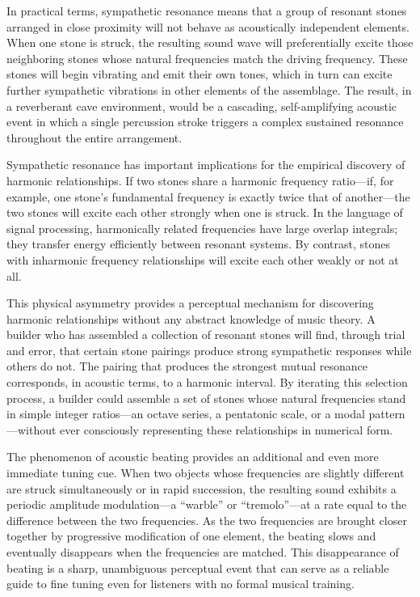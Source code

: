 \documentclass[12pt]{article}
\begin{document}
In practical terms, sympathetic resonance means that a group of resonant stones arranged in close proximity will not behave as acoustically independent elements. When one stone is struck, the resulting sound wave will preferentially excite those neighboring stones whose natural frequencies match the driving frequency. These stones will begin vibrating and emit their own tones, which in turn can excite further sympathetic vibrations in other elements of the assemblage. The result, in a reverberant cave environment, would be a cascading, self-amplifying acoustic event in which a single percussion stroke triggers a complex sustained resonance throughout the entire arrangement.

Sympathetic resonance has important implications for the empirical discovery of harmonic relationships. If two stones share a harmonic frequency ratio—if, for example, one stone's fundamental frequency is exactly twice that of another—the two stones will excite each other strongly when one is struck. In the language of signal processing, harmonically related frequencies have large overlap integrals; they transfer energy efficiently between resonant systems. By contrast, stones with inharmonic frequency relationships will excite each other weakly or not at all.

This physical asymmetry provides a perceptual mechanism for discovering harmonic relationships without any abstract knowledge of music theory. A builder who has assembled a collection of resonant stones will find, through trial and error, that certain stone pairings produce strong sympathetic responses while others do not. The pairing that produces the strongest mutual resonance corresponds, in acoustic terms, to a harmonic interval. By iterating this selection process, a builder could assemble a set of stones whose natural frequencies stand in simple integer ratios—an octave series, a pentatonic scale, or a modal pattern—without ever consciously representing these relationships in numerical form.

The phenomenon of acoustic beating provides an additional and even more immediate tuning cue. When two objects whose frequencies are slightly different are struck simultaneously or in rapid succession, the resulting sound exhibits a periodic amplitude modulation—a ``warble'' or ``tremolo''—at a rate equal to the difference between the two frequencies. As the two frequencies are brought closer together by progressive modification of one element, the beating slows and eventually disappears when the frequencies are matched. This disappearance of beating is a sharp, unambiguous perceptual event that can serve as a reliable guide to fine tuning even for listeners with no formal musical training.
\end{document}

